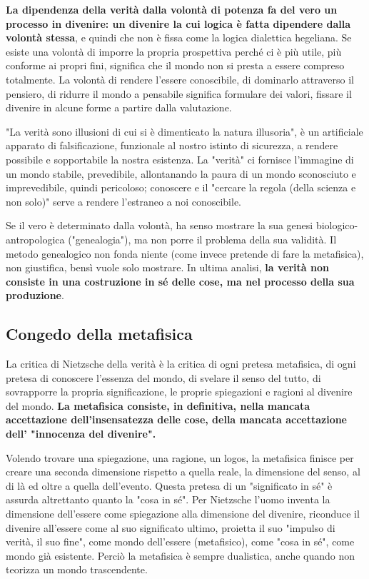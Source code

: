 \textbf{La dipendenza della verità dalla volontà di potenza fa del vero un processo in divenire: un divenire la cui logica è fatta dipendere dalla volontà stessa}, e quindi che non è fissa come la logica dialettica hegeliana. Se esiste una volontà di imporre la propria prospettiva perché ci è più utile, più conforme ai propri fini, significa che il mondo non si presta  a essere compreso totalmente. La volontà di rendere l'essere conoscibile, di dominarlo attraverso il pensiero, di ridurre il mondo a pensabile significa formulare dei valori, fissare il divenire in alcune forme a partire dalla valutazione.

"La verità sono illusioni di cui si è dimenticato la natura illusoria", è un artificiale apparato di falsificazione, funzionale al nostro istinto di sicurezza, a rendere possibile e sopportabile la nostra esistenza. La "verità" ci fornisce l'immagine di un mondo stabile, prevedibile, allontanando la paura di un mondo sconosciuto e imprevedibile, quindi pericoloso; conoscere e il "cercare la regola (della scienza e non solo)" serve a rendere l'estraneo a noi conoscibile.

Se il vero è determinato dalla volontà, ha senso mostrare la sua genesi biologico-antropologica ("genealogia"), ma non porre il problema della sua validità. Il metodo genealogico non fonda niente (come invece pretende di fare la metafisica), non giustifica, bensì vuole solo mostrare. In ultima analisi, \textbf{la verità non consiste in una costruzione in sé delle cose, ma nel processo della sua produzione}.

\subsection{Congedo della metafisica}

La critica di Nietzsche della verità è la critica di ogni pretesa metafisica, di ogni pretesa di conoscere l'essenza del mondo, di svelare il senso del tutto, di sovrapporre la propria significazione, le proprie spiegazioni  e ragioni al divenire del mondo. \textbf{La metafisica consiste, in definitiva, nella mancata accettazione dell'insensatezza delle cose, della mancata accettazione dell' "innocenza del divenire".}

Volendo trovare una spiegazione, una ragione, un logos, la metafisica finisce per creare una seconda dimensione rispetto a quella reale, la dimensione del senso, al di là ed oltre a quella dell'evento. Questa pretesa di un "significato in sé" è assurda altrettanto quanto la "cosa in sé". Per Nietzsche l'uomo inventa la dimensione dell'essere come spiegazione alla dimensione del divenire, riconduce il divenire all'essere come al suo significato ultimo, proietta il suo "impulso di verità, il suo fine", come mondo dell'essere (metafisico), come "cosa in sé", come mondo già esistente. Perciò la metafisica è sempre dualistica, anche quando non teorizza un mondo trascendente.

